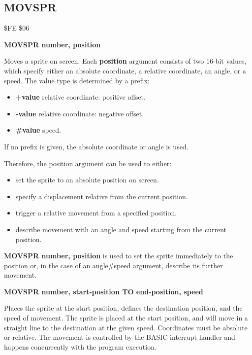 \subsection{MOVSPR}
\begin{description}[leftmargin=2cm,style=nextline]
\item [Token:] \$FE \$06
\item [Format:] {\bf MOVSPR number, position}
\item [Usage:]  Moves a sprite on screen. Each {\bf position} argument consists of two 16-bit values,
                which specify either an absolute coordinate, a relative coordinate,
                an angle, or a speed. The value type is determined by a prefix:

                \begin{itemize}
                    \item {\bf +value} relative coordinate: positive offset.
                    \item {\bf -value} relative coordinate: negative offset.
                    \item {\bf \#value} speed.
                \end{itemize}

                If no prefix is given, the absolute coordinate or angle is used.

                  Therefore, the position argument can be used to either:
                \begin{itemize}
                    \item set the sprite to an absolute position on screen.
                    \item specify a displacement relative from the current position.
                    \item trigger a relative movement from a specified position.
                    \item describe movement with an angle and speed starting from the current position.
                \end{itemize}

                {\bf MOVSPR number, position} is used to
                set the sprite immediately to the position or, in the case of
                an angle\#speed argument, describe its further movement.

\item [Format:] {\bf MOVSPR number, start-position TO end-position, speed}
\item [Usage:]  Places the sprite at the start position, defines the
                destination position, and the speed of movement.
                The sprite is placed at the start position, and will move
                in a straight line to the destination at the given speed.
                Coordinates must be absolute or relative.
                The movement is controlled by the BASIC interrupt handler and
                happens concurrently with the program execution.


\end{description}
